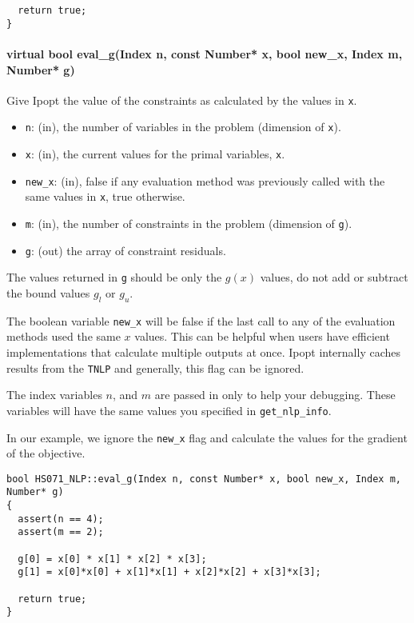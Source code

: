 \documentclass[letter,10pt]{article}
\begin{document}
{\begin{verbatim}
  return true;
}
\end{verbatim}


\paragraph{virtual bool eval\_g(Index n, const Number* x, 
        bool new\_x, Index m, Number* g)}
$\;$ \\
Give Ipopt the value of the constraints as calculated by the values in {\tt x}.
\begin{itemize}
\item {\tt n}: (in), the number of variables in the problem (dimension of {\tt x}). 
\item {\tt x}: (in), the current values for the primal variables, {\tt x}.
\item {\tt new\_x}: (in), false if any evaluation method was previously called 
        with the same values in {\tt x}, true otherwise.
\item {\tt m}: (in), the number of constraints in the problem (dimension of {\tt g}).
\item {\tt g}: (out) the array of constraint residuals.
\end{itemize}

The values returned in {\tt g} should be only the $g(x)$ values, 
do not add or subtract the bound values $g_l$ or $g_u$.

The boolean variable {\tt new\_x} will be false if the last call to
any of the evaluation methods used the same $x$ values. This can be
helpful when users have efficient implementations that calculate
multiple outputs at once. Ipopt internally caches results from the
{\tt TNLP} and generally, this flag can be ignored.

The index variables $n$, and $m$ are passed in only to help your
debugging. These variables will have the same values you specified in
{\tt get\_nlp\_info}.

In our example, we ignore the {\tt new\_x} flag and calculate the
values for the gradient of the objective.
\begin{verbatim}
bool HS071_NLP::eval_g(Index n, const Number* x, bool new_x, Index m, Number* g)
{
  assert(n == 4);
  assert(m == 2);

  g[0] = x[0] * x[1] * x[2] * x[3];
  g[1] = x[0]*x[0] + x[1]*x[1] + x[2]*x[2] + x[3]*x[3];

  return true;
} 
\end{verbatim}

}
\end{document}
